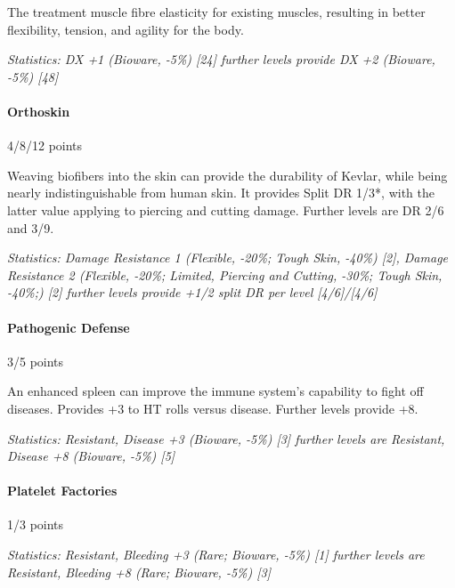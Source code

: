 \begin{multicols*}{3}
	The treatment muscle fibre elasticity for existing muscles, resulting in better flexibility, tension, and agility for the body.
	
	\textit{\textcolor{OliveGreen}{Statistics: DX +1 (Bioware, -5\%) [24] further levels provide DX +2 (Bioware, -5\%) [48]}}
	
	\paragraph{Orthoskin}
	\begin{flushright}
		4/8/12 points
	\end{flushright}
	
	Weaving biofibers into the skin can provide the durability of Kevlar, while being nearly indistinguishable from human skin. It provides Split DR 1/3*, with the latter value applying to piercing and cutting damage. Further levels are DR 2/6 and 3/9.
	
	\textit{\textcolor{OliveGreen}{Statistics: Damage Resistance 1 (Flexible, -20\%; Tough Skin, -40\%) [2], Damage Resistance 2 (Flexible, -20\%; Limited, Piercing and Cutting, -30\%; Tough Skin, -40\%;) [2] further levels provide +1/2 split DR per level [4/6]/[4/6]}}
	
	\paragraph{Pathogenic Defense}
	\begin{flushright}
		3/5 points
	\end{flushright}
	
	An enhanced spleen can improve the immune system's capability to fight off diseases. Provides +3 to HT rolls versus disease.  Further levels provide +8.
	
	\textit{\textcolor{OliveGreen}{Statistics: Resistant, Disease +3 (Bioware, -5\%) [3] further levels are Resistant, Disease +8 (Bioware, -5\%) [5]}}
	
	\paragraph{Platelet Factories}
	\begin{flushright}
		1/3 points
	\end{flushright}
	
	\textit{\textcolor{OliveGreen}{Statistics: Resistant, Bleeding +3 (Rare; Bioware, -5\%) [1] further levels are Resistant, Bleeding +8 (Rare; Bioware, -5\%) [3]}}
	

\end{multicols*}
